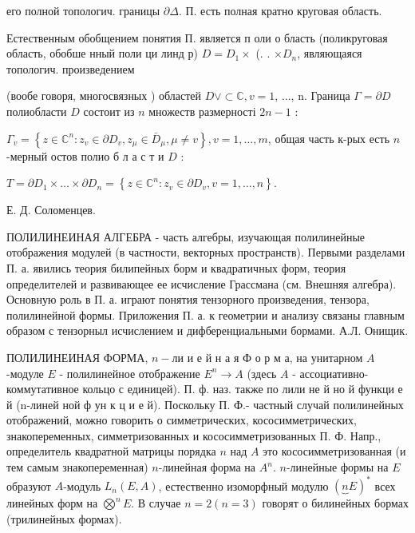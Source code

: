 \documentclass[10pt]{article}
\begin{document}
его полной топологич. границы $\partial \Delta$. П. есть полная кратно круговая область.



Естественным обобщением понятия П. является п оли о бласть (поликруговая область, обобше нный поли ци линд р) $D=D_{1} \times$ (. . $\times D_{n}$, являющаяся топологич. произведением

(вообе говоря, многосвязных ) областей $D \vee \subset \mathbb{C}, v=1$, ..., n. Граница $\Gamma=\partial D$ полиобласти $D$ состоит из $n$ множеств размерності $2 n-1$ :



$\Gamma_{v}=\left\{z \in \mathbb{C}^{n}: z_{v} \in \partial D_{v}, z_{\mu} \in \bar{D}_{\mu}, \mu \neq v\right\}, v=1, \ldots, m$, общая часть к-рых есть $n$-мерный остов полио б л а с т и $D$ :



$T=\partial D_{1} \times \ldots \times \partial D_{n}=\left\{z \in \mathbb{C}^{n}: z_{v} \in \partial D_{v}, v=1, \ldots, n\right\}$.



Е. Д. Соломенцев.



ПОЛИЛИНЕИНАЯ АЛГЕБРА - часть алгебры, изучающая полилинейные отображения модулей (в частности, векторных пространств). Первыми разделами П. а. явились теория билипейных борм и квадратичных форм, теория определителей и развивающее ее исчисление Грассмана (см. Внешняя алгебра). Основную роль в П. а. играют понятия тензорного произведения, тензора, полилинейной формы. Приложения П. а. к геометрии и анализу связаны главным образом с тензорныл исчислением и дифберенциальными бормами. А.Л. Онищик.



ПОЛИЛИНЕИНАЯ ФОРМА, $n-л и$ и е й н а я Ф о р м а, на унитарном $A$-модуле $E$ - полилинейное отображение $E^{n} \rightarrow A$ (здесь $A$ - ассоциативно-коммутативное кольцо с единицей). П. ф. наз. также по лили не й но й функци е й (n-линей ной ф ун к ц и е й). Поскольку П. Ф.- частный случай полилинейных отображений, можно говорить о симметрических, кососимметрических, знакопеременных, симметризованных и кососимметризованных П. Ф. Напр., определитель квадратной матрицы порядка $n$ над $A$ это кососимметризованная (и тем самым знакопеременная) $n$-линейная форма на $A^{n}$. $n$-линейные формы на $E$ образуют $A$-модуль $L_{n}(E, A)$, естественно изоморфный модулю $(\underbrace{n} E)^{*}$ всех линейных форм на $\bigotimes^{n} E$. В случае $n=2(n=3)$ говорят о билинейных бормах (трилинейных формах).
\end{document}
